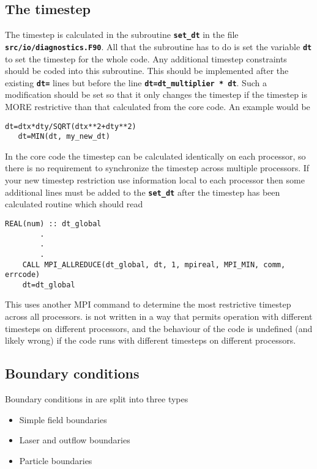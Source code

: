 \documentclass[12pt,a4paper]{article}
\newcommand{\simpleboxverbatim}{\begin{Verbatim}[obeytabs=true,frame=single,
  framerule=0.5mm,rulecolor=\color{warwickmid},formatcom=\color{black}]}
\newcommand{\inlinecode}[1]{{\color{warwickred} \bf\texttt{#1}}}
\newcommand{\EPOCH}{{\color{warwickdark}\fontfamily{phv}\selectfont{EPOCH}}}
\begin{document}
\subsection{The timestep}

The timestep is calculated in the subroutine \inlinecode{set\_dt} in the file
\inlinecode{src/io/diagnostics.F90}. All that the subroutine has to do is set
the variable \inlinecode{dt} to set the timestep for the whole code. Any
additional timestep constraints should be coded into this subroutine. This
should be implemented after the existing \inlinecode{dt=} lines but before the
line \inlinecode{dt=dt\_multiplier * dt}. Such a modification should be set so
that it only changes the timestep if the timestep is MORE restrictive than that
calculated from the core code. An example would be

\simpleboxverbatim
   dt=dtx*dty/SQRT(dtx**2+dty**2)
   dt=MIN(dt, my_new_dt)
\end{Verbatim}

In the core {\EPOCH} code the timestep can be calculated identically on each
processor, so there is no requirement to synchronize the timestep across
multiple processors. If your new timestep restriction use information local to
each processor then some additional lines must be added to the
\inlinecode{set\_dt} after the timestep has been calculated routine which
should read

\simpleboxverbatim
	REAL(num) :: dt_global
		.
		.
		.
	CALL MPI_ALLREDUCE(dt_global, dt, 1, mpireal, MPI_MIN, comm, errcode)
	dt=dt_global
\end{Verbatim}

This uses another MPI command to determine the most restrictive timestep across
all processors. {\EPOCH} is not written in a way that permits operation with
different timesteps on different processors, and the behaviour of the code is
undefined (and likely wrong) if the code runs with different timesteps on
different processors.

\subsection{Boundary conditions}
Boundary conditions in {\EPOCH} are split into three types
\begin{itemize}
\item Simple field boundaries
\item Laser and outflow boundaries
\item Particle boundaries
\end{itemize}
\end{document}

